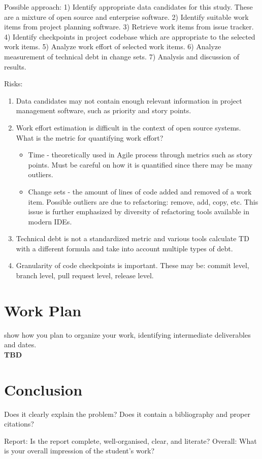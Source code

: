 \documentclass{mprop}
\begin{document}
Possible approach: 1) Identify appropriate data candidates for this study. These
are a mixture of open source and enterprise software. 2) Identify suitable work
items from project planning software. 3) Retrieve work items from issue tracker.
4) Identify checkpoints in project codebase which are appropriate to the
selected work items. 5) Analyze work effort of selected work items. 6) Analyze
measurement of technical debt in change sets. 7) Analysis and discussion of
results.

Risks:
\begin{enumerate}
	\item Data candidates may not contain enough relevant information in
	project management software, such as priority and story points.
	\item Work effort estimation is difficult in the context of open source
	systems. What is the metric for quantifying work effort?
	      \begin{itemize}
		      \item Time - theoretically used in Agile process through
		            metrics such as story points. Must be careful on how it
		            is quantified since there may be many outliers.
		      \item Change sets - the amount of lines of code added and
		            removed of a work item. Possible outliers are due to
		            refactoring: remove, add, copy, etc. This issue is
		            further emphasized by diversity of refactoring tools
		            available in modern IDEs.
	      \end{itemize}
	\item Technical debt is not a standardized metric and various tools
	calculate TD with a different formula and take into account multiple types
	of debt.
	\item Granularity of code checkpoints is important. These may be: commit
	level, branch level, pull request level, release level.
\end{enumerate}

\section{Work Plan}

show how you plan to organize your work, identifying intermediate deliverables
and dates.\\
\textbf{TBD}

\section{Conclusion}

Does it clearly explain the problem? Does it contain a bibliography and proper
citations?

Report: Is the report complete, well-organised, clear, and literate? Overall:
What is your overall impression of the student’s work?

\pagebreak


\end{document}

